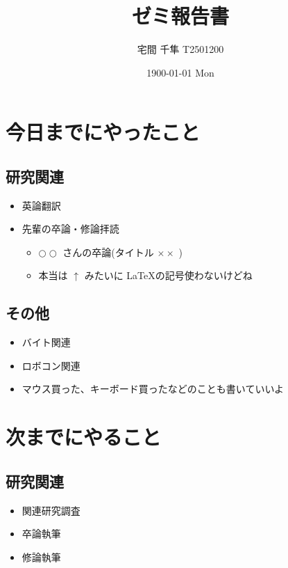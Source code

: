\documentclass[uplatex, onecolumn, 10pt]{jsarticle}
\begin{document}
\title{\vspace{-40mm}\bf{\LARGE{ゼミ報告書}}}
\author{\vspace{-40mm}宅間 千隼  T2501200}
\date{1900-01-01 Mon}
\maketitle


\section{今日までにやったこと}

\subsection*{研究関連}
\begin{itemize}
	\item 英論翻訳
	\item 先輩の卒論・修論拝読
	\begin{itemize}
        \item $\bigcirc \bigcirc$ さんの卒論(タイトル $\times \times$ )
        \item 本当は $\uparrow$ みたいに \LaTeX の記号使わないけどね
    \end{itemize}
\end{itemize}

\subsection*{その他}
\begin{itemize}
	\item バイト関連
	\item ロボコン関連
	\item マウス買った、キーボード買ったなどのことも書いていいよ
\end{itemize}



\section{次までにやること}

\subsection*{研究関連}
\begin{itemize}
	\item 関連研究調査
    \item 卒論執筆
	\item 修論執筆
\end{itemize}
\end{document}
